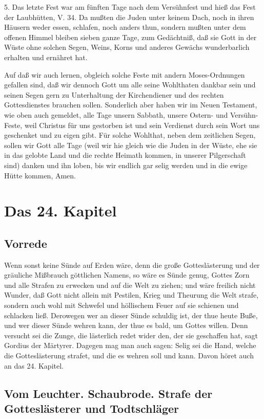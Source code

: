 5. Das letzte Fest war am fünften Tage nach dem Versühnfest und hieß das Fest der Laubhütten, V. 34. Da mußten die Juden unter keinem Dach, noch in ihren Häusern weder essen, schlafen, noch anders thun, sondern mußten unter dem offenen Himmel bleiben sieben ganze Tage, zum Gedächtniß, daß sie Gott in der Wüste ohne solchen Segen, Weins, Korns und anderes Gewächs wunderbarlich erhalten und ernähret hat.

Auf daß wir auch lernen, obgleich solche Feste mit andern Moses-Ordnungen gefallen sind, daß wir dennoch Gott um alle seine Wohlthaten dankbar sein und seinen Segen gern zu Unterhaltung der Kirchendiener und des rechten Gottesdienstes brauchen sollen. Sonderlich aber haben wir im Neuen Testament, wie oben auch gemeldet, alle Tage unsern Sabbath, unsere Ostern- und Versühn-Feste, weil Christus für uns gestorben ist und sein Verdienst durch sein Wort uns geschenket und zu eigen gibt. Für solche Wohlthat, neben dem zeitlichen Segen, sollen wir Gott alle Tage (weil wir hie gleich wie die Juden in der Wüste, ehe sie in das gelobte Land und die rechte Heimath kommen, in unserer Pilgerschaft sind) danken und ihn loben, bis wir endlich gar selig werden und in die ewige Hütte kommen, Amen.

\chapter{Das 24. Kapitel}

\section{Vorrede}

Wenn sonst keine Sünde auf Erden wäre, denn die große Gotteslästerung und der gräuliche Mißbrauch göttlichen Namens, so wäre es Sünde genug, Gottes Zorn und alle Strafen zu erwecken und auf die Welt zu ziehen; und wäre freilich nicht Wunder, daß Gott nicht allein mit Pestilen, Krieg und Theurung die Welt strafe, sondern auch wohl mit Schwefel und höllischem Feuer auf sie schienen und schlacken ließ. Derowegen wer an dieser Sünde schuldig ist, der thue heute Buße, und wer dieser Sünde wehren kann, der thue es bald, um Gottes willen. Denn versucht sei die Zunge, die lästerlich redet wider den, der sie geschaffen hat, sagt Gordius der Märtyrer. Dagegen mag man auch sagen: Selig sei die Hand, welche die Gotteslästerung strafet, und die es wehren soll und kann. Davon höret auch an das 24. Kapitel.

\section{Vom Leuchter. Schaubrode. Strafe der Gotteslästerer und Todtschläger}

